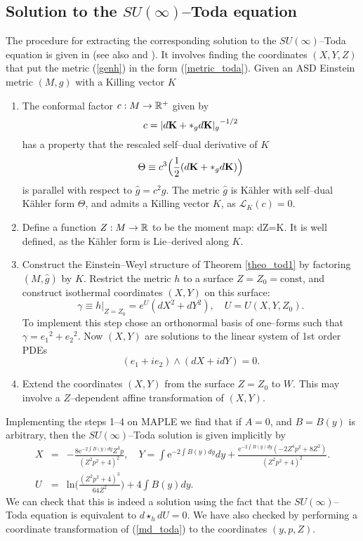 \subsection{Solution to the $SU(\infty)$--Toda equation}
\label{steps_sec}
The procedure for extracting the corresponding solution to the $SU(\infty)$--Toda equation is given in \cite{Tod_note} 
(see also \cite{LeBrun} and \cite{DT}). It involves finding the coordinates $(X,Y,Z)$ that put the metric (\ref{genh}) in the 
form (\ref{metric_toda}). Given an ASD Einstein metric $(M, g)$ with a
Killing vector $K$
\begin{enumerate}
\item The conformal factor $c:M\rightarrow \mathbb{R}^+$  given by
\[
c={|d{\bf K}+*_g d{\bf K}|_{g}}^{-1/2}
\]
has a property that
the rescaled self--dual derivative of $K$
\[
\Theta\equiv c^3\Big(\frac{1}{2}(d{\bf K}+*_g d{\bf K})\Big)
\]
is parallel with respect to $\hat{g}=c^2 g$.
The metric $\hat{g}$ is K\"ahler with  self--dual 
K\"ahler form $\Theta$, and admits a Killing vector $K$, as
${\mathcal L}_K(c)=0$.
\item
Define a function $Z:M\rightarrow \mathbb{R}$ to be the moment map:
\be
\label{ztilde}
dZ=K\hook \Theta.
\ee
It is well defined, as the K\"ahler form is Lie--derived along $K$.
\item
Construct the Einstein--Weyl structure of Theorem \ref{theo_tod1}
by factoring $(M, \hat{g})$ by $K$. Restrict the metric $h$
to a surface $Z=Z_0=\mbox{const}$, and construct isothermal coordinates 
$(X, Y)$ on this surface:
\[
\gamma\equiv h|_{Z=Z_0}=e^{U}(dX^2+dY^2), \quad U=U(X, Y, Z_0).
\]
To implement this step chose an orthonormal basis of one--forms
such that $\gamma= {e_1}^2+{e_2}^2$. Now $(X, Y)$ are solutions to the linear
system of 1st order PDEs
\[
(e_1+ie_2)\wedge (dX+idY)=0.
\]
\item Extend the coordinates $(X, Y)$ from the surface $Z=Z_0$ to $W$. This may
involve a $Z$--dependent affine transformation of $(X, Y)$.
\end{enumerate}
Implementing the steps 1--4 on MAPLE we find that if $A=0$, and $B=B(y)$ 
is arbitrary, then the $SU(\infty)$--Toda solution is given implicitly by
\begin{eqnarray}
\label{toda_implicit1}
 X&=&-\frac{8\mathrm{e}^{-2\int{B(y)dy}}Z^3p}{(Z^2p^2+4)^2},\quad
Y=\int{\mathrm{e}^{-2\int{B(y)dy}}dy}+\frac{\mathrm{e}^{-2\int{B(y)dy}}(-2Z^4p^2+8Z^2)}{(Z^2p^2+4)^2}.\nonumber\\
U&=&\mathrm{ln}\bigg(\frac{(Z^2p^2+4)^3}{64Z^2}\bigg)+4\int{B(y)dy}.
\end{eqnarray}
We can check that this is indeed a solution using the fact that the $SU(\infty)$--Toda equation is equivalent to 
$d\star_h dU=0$. We have also checked by performing a coordinate transformation of (\ref{md_toda}) to the coordinates $(y,p,Z)$.

